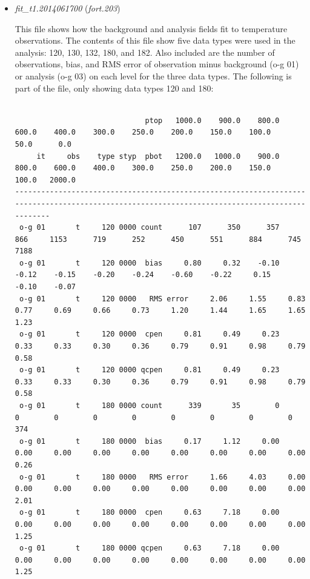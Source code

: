 \begin{itemize}[leftmargin=*]
\item \textit{fit\_t1.2014061700} (\textit{fort.203})

This file shows how the background and analysis fields fit to temperature observations.  The contents of this file show five data types were used in the analysis: 120, 130, 132, 180, and 182.  Also included are the number of observations, bias, and RMS error of observation minus background (o-g 01) or analysis (o-g 03) on each level for the three data types.  The following is part of the file, only showing data types 120 and 180:

\begin{tiny}
\begin{verbatim}

                              ptop   1000.0    900.0    800.0    600.0    400.0    300.0    250.0    200.0    150.0    100.0     50.0      0.0
     it     obs    type styp  pbot   1200.0   1000.0    900.0    800.0    600.0    400.0    300.0    250.0    200.0    150.0    100.0   2000.0
----------------------------------------------------------------------------------------------------------------------------------------------
 o-g 01       t     120 0000 count      107      350      357      866     1153      719      252      450      551      884      745     7188
 o-g 01       t     120 0000  bias     0.80     0.32    -0.10    -0.12    -0.15    -0.20    -0.24    -0.60    -0.22     0.15    -0.10    -0.07
 o-g 01       t     120 0000   RMS error     2.06     1.55     0.83     0.77     0.69     0.66     0.73     1.20     1.44     1.65     1.65     1.23
 o-g 01       t     120 0000  cpen     0.81     0.49     0.23     0.33     0.33     0.30     0.36     0.79     0.91     0.98     0.79     0.58
 o-g 01       t     120 0000 qcpen     0.81     0.49     0.23     0.33     0.33     0.30     0.36     0.79     0.91     0.98     0.79     0.58
 o-g 01       t     180 0000 count      339       35        0        0        0        0        0        0        0        0        0      374
 o-g 01       t     180 0000  bias     0.17     1.12     0.00     0.00     0.00     0.00     0.00     0.00     0.00     0.00     0.00     0.26
 o-g 01       t     180 0000   RMS error     1.66     4.03     0.00     0.00     0.00     0.00     0.00     0.00     0.00     0.00     0.00     2.01
 o-g 01       t     180 0000  cpen     0.63     7.18     0.00     0.00     0.00     0.00     0.00     0.00     0.00     0.00     0.00     1.25
 o-g 01       t     180 0000 qcpen     0.63     7.18     0.00     0.00     0.00     0.00     0.00     0.00     0.00     0.00     0.00     1.25

\end{verbatim}
\end{tiny}
\end{itemize}
